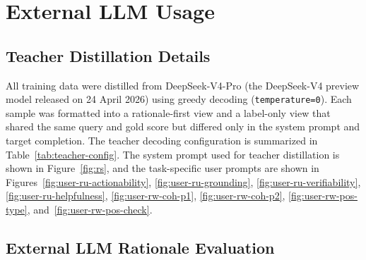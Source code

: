 \section{External LLM Usage}
\label{app:external-llm}

\subsection{Teacher Distillation Details}
\label{app:teacher-distillation}


All training data were distilled from DeepSeek-V4-Pro 
(the DeepSeek-V4 preview model released on 24 April 2026) using greedy 
decoding (\texttt{temperature=0}). Each sample was formatted into a 
rationale-first view and a label-only view that shared the same query 
and gold score but differed only in the system prompt and target completion. 
The teacher decoding configuration is summarized 
in Table~\ref{tab:teacher-config}.
The system prompt used for teacher distillation is shown in
Figure~\ref{fig:rs}, and the task-specific user prompts are shown in
Figures~\ref{fig:user-ru-actionability}, \ref{fig:user-ru-grounding},
\ref{fig:user-ru-verifiability}, \ref{fig:user-ru-helpfulness},
\ref{fig:user-rw-coh-p1}, \ref{fig:user-rw-coh-p2},
\ref{fig:user-rw-pos-type}, and~\ref{fig:user-rw-pos-check}.

\subsection{External LLM Rationale Evaluation}
\label{app:rationale-quality-evaluation}


